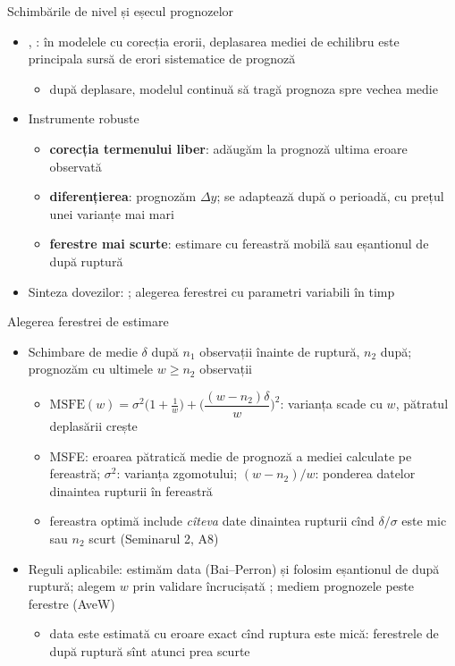 \begin{frame}{Schimbările de nivel și eșecul prognozelor}
\itemsize{\small}
\begin{itemize}
    \item {}, : în modelele cu corecția erorii, deplasarea mediei de echilibru este principala sursă de erori sistematice de prognoză
    \begin{itemize}
        \item după deplasare, modelul continuă să tragă prognoza spre vechea medie
    \end{itemize}
    \item Instrumente robuste
    \begin{itemize}
        \item \textbf{corecția termenului liber}: adăugăm la prognoză ultima eroare observată
        \item \textbf{diferențierea}: prognozăm $\Delta y$; se adaptează după o perioadă, cu prețul unei varianțe mai mari
        \item \textbf{ferestre mai scurte}: estimare cu fereastră mobilă sau eșantionul de după ruptură
    \end{itemize}
    \item Sinteza dovezilor: ; alegerea ferestrei cu parametri variabili în timp 
\end{itemize}
\end{frame}

\begin{frame}{Alegerea ferestrei de estimare}
\itemsize{\small}
\begin{itemize}
    \item Schimbare de medie $\delta$ după $n_1$ observații înainte de ruptură, $n_2$ după; prognozăm cu ultimele $w \ge n_2$ observații 
    \begin{itemize}
        \item $\mathrm{MSFE}(w) = \sigma^2\big(1 + \tfrac1w\big) + \Big(\dfrac{(w - n_2)\delta}{w}\Big)^2$: varianța scade cu $w$, pătratul deplasării crește
        \item MSFE: eroarea pătratică medie de prognoză a mediei calculate pe fereastră; $\sigma^2$: varianța zgomotului; $(w - n_2)/w$: ponderea datelor dinaintea rupturii în fereastră
        \item fereastra optimă include \emph{cîteva} date dinaintea rupturii cînd $\delta/\sigma$ este mic sau $n_2$ scurt (Seminarul 2, A8)
    \end{itemize}
    \item Reguli aplicabile: estimăm data (Bai--Perron) și folosim eșantionul de după ruptură; alegem $w$ prin validare încrucișată ; mediem prognozele peste ferestre (AveW) 
    \begin{itemize}
        \item data este estimată cu eroare exact cînd ruptura este mică: ferestrele de după ruptură sînt atunci prea scurte
    \end{itemize}
\end{itemize}
\end{frame}

